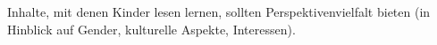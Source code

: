 Inhalte, mit denen Kinder lesen lernen, sollten Perspektivenvielfalt bieten (in Hinblick auf Gender, kulturelle Aspekte, Interessen).